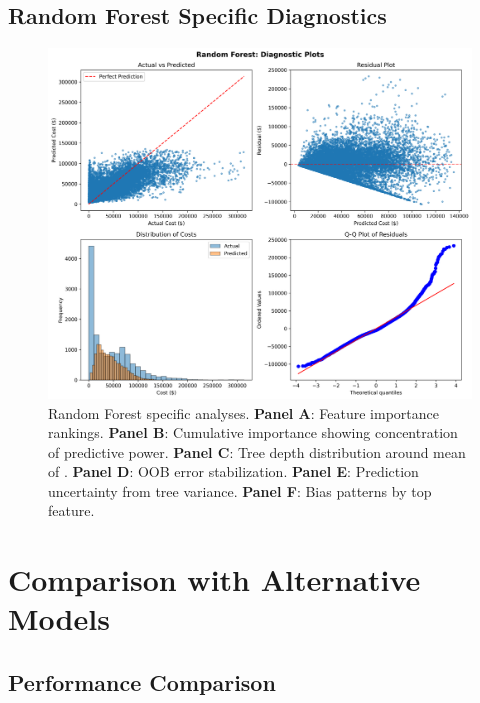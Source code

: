 \subsection{Random Forest Specific Diagnostics}

\begin{figure}[h]
\centering
\includegraphics[width=\textwidth]{models/model_9/diagnostic_plots.png}
\caption{Random Forest specific analyses. \textbf{Panel A}: Feature importance rankings. \textbf{Panel B}: Cumulative importance showing concentration of predictive power. \textbf{Panel C}: Tree depth distribution around mean of \ModelNineAvgTreeDepth{}. \textbf{Panel D}: OOB error stabilization. \textbf{Panel E}: Prediction uncertainty from tree variance. \textbf{Panel F}: Bias patterns by top feature.}
\label{fig:model9_rf_diagnostics}
\end{figure}

\section{Comparison with Alternative Models}

\subsection{Performance Comparison}

